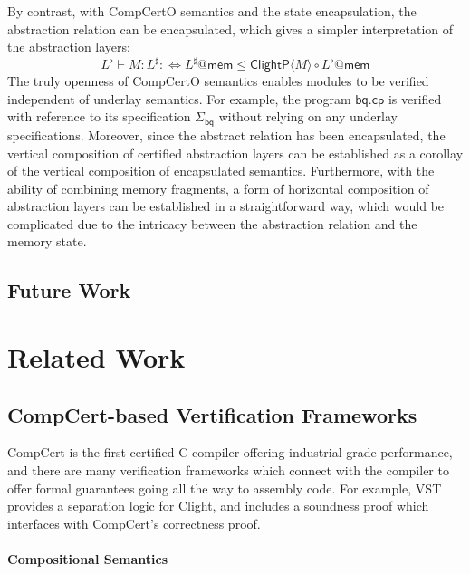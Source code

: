 \documentclass[acmsmall,screen,review,anonymous]{acmart}
\newcommand{\kw}[1]{\ensuremath{ \mathsf{#1} }}
\begin{document}
By contrast, with CompCertO semantics and the state encapsulation,
the abstraction relation can be encapsulated,
which gives a simpler interpretation of the abstraction layers:
\[
  L^\flat \vdash M : L^\sharp :\Leftrightarrow L^\sharp @ \kw{mem} \le \kw{ClightP} \langle M \rangle \circ L^\flat @ \kw{mem}
\]
The truly openness of CompCertO semantics
enables modules to be verified independent of underlay semantics.
For example, the program $\kw{bq.cp}$ is verified
with reference to its specification $\Sigma_\kw{bq}$
without relying on any underlay specifications.
Moreover,
since the abstract relation has been encapsulated,
the vertical composition of certified abstraction layers
can be established as a corollay of
the vertical composition of encapsulated semantics.
Furthermore,
with the ability of combining memory fragments,
a form of horizontal composition of
abstraction layers can be established
in a straightforward way,
which would be complicated due to
the intricacy between the abstraction relation
and the memory state.

\subsection{Future Work}


\section{Related Work} %

\subsection{CompCert-based Vertification Frameworks}

CompCert \cite{compcert}
is the first certified C compiler offering industrial-grade performance,
and there are many verification frameworks which connect with the compiler
to offer formal guarantees going all the way to assembly code.
For example, VST \cite{vst}
provides a separation logic for Clight,
and includes a soundness proof which interfaces with CompCert's correctness proof.

\paragraph{Compositional Semantics}
\end{document}

